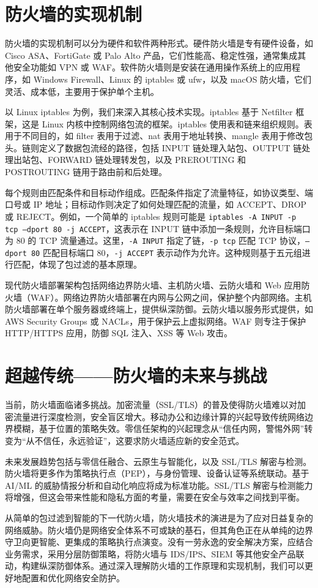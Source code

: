 \chapter{防火墙的实现机制}
防火墙的实现机制可以分为硬件和软件两种形式。硬件防火墙是专有硬件设备，如 Cisco ASA、FortiGate 或 Palo Alto 产品，它们性能高、稳定性强，通常集成其他安全功能如 VPN 或 WAF。软件防火墙则是安装在通用操作系统上的应用程序，如 Windows Firewall、Linux 的 iptables 或 ufw，以及 macOS 防火墙，它们灵活、成本低，主要用于保护单个主机。\par
以 Linux iptables 为例，我们来深入其核心技术实现。iptables 基于 Netfilter 框架，这是 Linux 内核中控制网络包流的框架。iptables 使用表和链来组织规则。表用于不同目的，如 filter 表用于过滤、nat 表用于地址转换、mangle 表用于修改包头。链则定义了数据包流经的路径，包括 INPUT 链处理入站包、OUTPUT 链处理出站包、FORWARD 链处理转发包，以及 PREROUTING 和 POSTROUTING 链用于路由前和后处理。\par
每个规则由匹配条件和目标动作组成。匹配条件指定了流量特征，如协议类型、端口号或 IP 地址；目标动作则决定了如何处理匹配的流量，如 ACCEPT、DROP 或 REJECT。例如，一个简单的 iptables 规则可能是 \texttt{iptables -A INPUT -p tcp --dport 80 -j ACCEPT}，这表示在 INPUT 链中添加一条规则，允许目标端口为 80 的 TCP 流量通过。这里，\texttt{-A INPUT} 指定了链，\texttt{-p tcp} 匹配 TCP 协议，\texttt{--dport 80} 匹配目标端口 80，\texttt{-j ACCEPT} 表示动作为允许。这种规则基于五元组进行匹配，体现了包过滤的基本原理。\par
现代防火墙部署架构包括网络边界防火墙、主机防火墙、云防火墙和 Web 应用防火墙（WAF）。网络边界防火墙部署在内网与公网之间，保护整个内部网络。主机防火墙部署在单个服务器或终端上，提供纵深防御。云防火墙以服务形式提供，如 AWS Security Groups 或 NACLs，用于保护云上虚拟网络。WAF 则专注于保护 HTTP/HTTPS 应用，防御 SQL 注入、XSS 等 Web 攻击。\par
\chapter{超越传统——防火墙的未来与挑战}
当前，防火墙面临诸多挑战。加密流量（SSL/TLS）的普及使得防火墙难以对加密流量进行深度检测，安全盲区增大。移动办公和边缘计算的兴起导致传统网络边界模糊，基于位置的策略失效。零信任架构的兴起理念从“信任内网，警惕外网”转变为“从不信任，永远验证”，这要求防火墙适应新的安全范式。\par
未来发展趋势包括与零信任融合、云原生与智能化，以及 SSL/TLS 解密与检测。防火墙将更多作为策略执行点（PEP），与身份管理、设备认证等系统联动。基于 AI/ML 的威胁情报分析和自动化响应将成为标准功能。SSL/TLS 解密与检测能力将增强，但这会带来性能和隐私方面的考量，需要在安全与效率之间找到平衡。\par
从简单的包过滤到智能的下一代防火墙，防火墙技术的演进是为了应对日益复杂的网络威胁。防火墙仍是网络安全体系不可或缺的基石，但其角色正在从单纯的边界守卫向更智能、更集成的策略执行点演变。没有一劳永逸的安全解决方案，应结合业务需求，采用分层防御策略，将防火墙与 IDS/IPS、SIEM 等其他安全产品联动，构建纵深防御体系。通过深入理解防火墙的工作原理和实现机制，我们可以更好地配置和优化网络安全防护。\par
